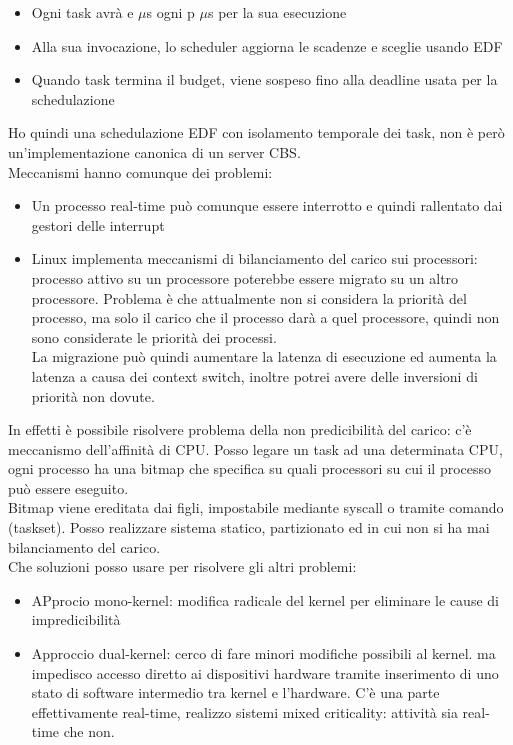 \documentclass{article}
\begin{document}
\begin{itemize}
\item Ogni task avrà e $\mu$s ogni p $\mu$s per la sua esecuzione
\item Alla sua invocazione, lo scheduler aggiorna le scadenze e sceglie usando EDF
\item Quando task termina il budget, viene sospeso fino alla deadline usata per la schedulazione
\end{itemize}
Ho quindi una schedulazione EDF con isolamento temporale dei task, non è però un'implementazione canonica di un server CBS.\\ Meccanismi hanno comunque dei problemi:
\begin{itemize}
\item Un processo real-time può comunque essere interrotto e quindi rallentato dai gestori delle interrupt
\item Linux implementa meccanismi di bilanciamento del carico sui processori: processo attivo su un processore poterebbe essere migrato su un altro processore. Problema è che attualmente non si considera la priorità del processo, ma solo il carico che il processo darà a quel processore, quindi non sono considerate le priorità dei processi.\\ La migrazione può quindi aumentare la latenza di esecuzione ed aumenta la latenza a causa dei context switch, inoltre potrei avere delle inversioni di priorità non dovute.
\end{itemize}
In effetti è possibile risolvere problema della non predicibilità del carico: c'è meccanismo dell'affinità di CPU. Posso legare un task ad una determinata CPU, ogni processo ha una bitmap  che specifica su quali processori su cui il processo può essere eseguito.\\ Bitmap viene ereditata dai figli, impostabile mediante syscall o tramite comando (taskset). Posso realizzare sistema statico, partizionato ed in  cui non si ha mai bilanciamento del carico.\\ Che soluzioni posso usare per risolvere gli altri problemi:
\begin{itemize}
\item APprocio mono-kernel: modifica radicale del kernel per eliminare le cause di impredicibilità
\item Approccio dual-kernel: cerco di fare minori modifiche possibili al kernel. ma impedisco accesso diretto ai dispositivi hardware tramite inserimento di uno stato di software intermedio tra kernel e l'hardware. C'è una parte effettivamente real-time, realizzo sistemi mixed criticality: attività sia real-time che non.
\end{itemize}
\end{document}
